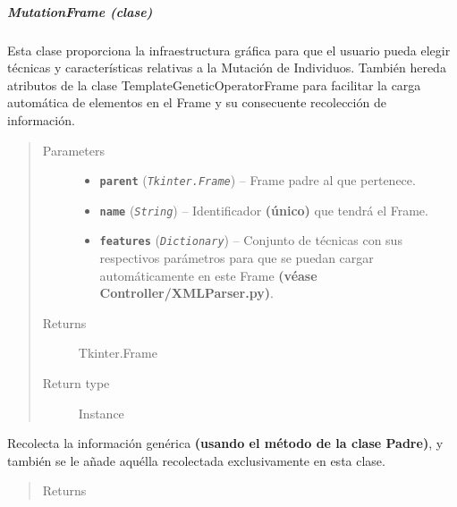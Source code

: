 \documentclass[class=report, crop=false]{standalone}
\begin{document}
\subparagraph{MutationFrame (clase)}
\label{sec:a_3_2_5_2_3}
\begin{fulllineitems}

\begin{DUlineblock}{0em}
\item[] Esta clase proporciona la infraestructura gráfica para que el 
usuario pueda elegir técnicas y características relativas a la Mutación 
de Individuos.\break
También hereda atributos de la clase TemplateGeneticOperatorFrame 
para facilitar la carga automática de elementos en el Frame y su 
consecuente recolección de información.
\end{DUlineblock}

\begin{quote}\begin{description}
\item[{Parameters}] \leavevmode\begin{itemize}
\item \textbf{\texttt{parent}} (\emph{\texttt{Tkinter.Frame}}) -- Frame padre al que pertenece.
\item \textbf{\texttt{name}} (\emph{\texttt{String}}) -- Identificador \textbf{(único)} que tendrá el Frame.
\item \textbf{\texttt{features}} (\emph{\texttt{Dictionary}}) -- Conjunto de técnicas con sus respectivos parámetros para que se puedan cargar automáticamente en este Frame \textbf{(véase Controller/XMLParser.py)}.
\end{itemize}

\item[{Returns}] \leavevmode
Tkinter.Frame
\item[{Return type}] \leavevmode
Instance
\end{description}\end{quote}


\begin{fulllineitems}

Recolecta la información genérica \textbf{(usando el método de la clase Padre)}, 
y también se le añade aquélla recolectada exclusivamente 
en esta clase.

\begin{quote}\begin{description}
\item[{Returns}] \leavevmode


\end{description}
\end{quote}
\end{fulllineitems}
\end{fulllineitems}
\end{document}
